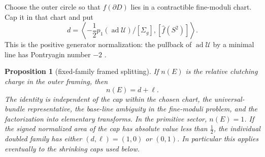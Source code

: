 \documentclass[11pt]{amsart}
\newtheorem{proposition}[theorem]{Proposition}
\theoremstyle{definition}
\theoremstyle{remark}
\theoremstyle{plain}
\newcommand{\ad}{\operatorname{ad}}
\begin{document}
Choose the outer circle so that $f(\partial D)$ lies in a contractible
fine-moduli chart.  Cap it in that chart and put
\begin{equation}\label{eq:capped-degree}
 d=\left\langle
 -\frac12p_1(\ad\mathcal U)/[\Sigma_g],
 [\widehat f(S^2)]\right\rangle .
\end{equation}
This is the positive generator normalization: the pullback of
$\ad\mathcal U$ by a minimal line has Pontryagin number $-2$
\cite[Proposition~3]{Munoz99b}.

\begin{proposition}[fixed-family framed splitting]
\label{prop:framed-splitting}
If $n(E)$ is the relative clutching charge in the outer framing, then
\begin{equation}\label{eq:finite-charge-splitting}
                              n(E)=d+\ell.
\end{equation}
The identity is independent of the cap within the chosen chart, the universal-bundle
representative, the base-line ambiguity in the fine-moduli problem, and
the factorization into elementary transforms.  In the primitive sector,
$n(E)=1$. If the signed normalized area of the cap has absolute
value less than $\frac12$, the individual doubled family has
either $(d,\ell)=(1,0)$ or $(0,1)$. In particular this applies
eventually to the shrinking caps used below.
\end{proposition}
\end{document}
